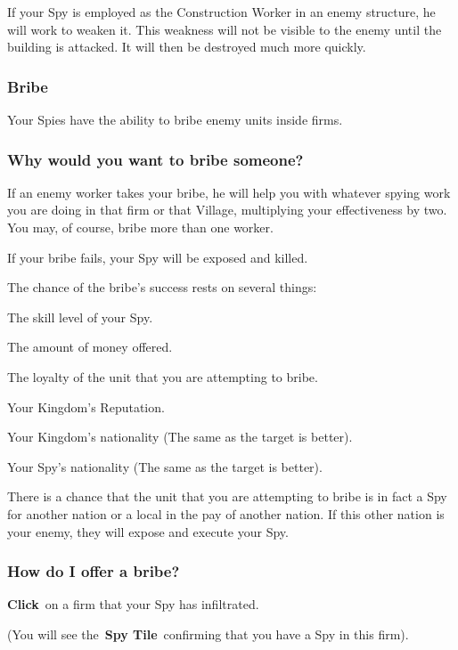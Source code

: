If your Spy is employed as the Construction Worker in an enemy structure, he will work to weaken it. This weakness will not be visible to the enemy until the building is attacked. It will then be destroyed much more quickly.

\subsubsection{Bribe}

Your Spies have the ability to bribe enemy units inside firms.

\subsubsection{Why would you want to bribe someone?}

If an enemy worker takes your bribe, he will help you with whatever spying work you are doing in that firm or that Village, multiplying your effectiveness by two. You may, of course, bribe more than one worker.

If your bribe fails, your Spy will be exposed and killed.

The chance of the bribe’s success rests on several things:

\begin{adjustwidth}{1cm}{}
The skill level of your Spy.

The amount of money offered.

The loyalty of the unit that you are attempting to bribe.

Your Kingdom’s Reputation.

Your Kingdom’s nationality (The same as the target is better).

Your Spy’s nationality (The same as the target is better).
\end{adjustwidth}

There is a chance that the unit that you are attempting to bribe is in fact a Spy for another nation or a local in the pay of another nation. If this other nation is your enemy, they will expose and execute your Spy.

\subsubsection{How do I offer a bribe?}

\textbf{Click} on a firm that your Spy has infiltrated.

(You will see the \textbf{Spy Tile} confirming that you have a Spy in this firm).

